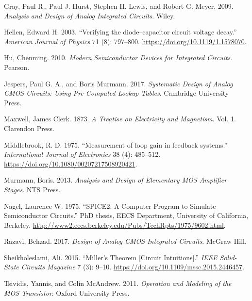 \documentclass[
  a4paper,
  DIV=11,
  numbers=noendperiod]{scrartcl}
\newlength{\cslhangindent}
\newenvironment{CSLReferences}[2] %
 {\begin{list}{}{%
  \setlength{\itemindent}{0pt}
  \setlength{\leftmargin}{0pt}
  \setlength{\parsep}{0pt}
  \ifodd #1
   \setlength{\leftmargin}{\cslhangindent}
   \setlength{\itemindent}{-1\cslhangindent}
  \fi
  \setlength{\itemsep}{#2\baselineskip}}}
 {\end{list}}
\begin{document}
\label{refs}
\begin{CSLReferences}{1}{0}
Gray, Paul R., Paul J. Hurst, Stephen H. Lewis, and Robert G. Meyer.
2009. \emph{{Analysis and Design of Analog Integrated Circuits}}. Wiley.

Hellen, Edward H. 2003. {``{Verifying the diode--capacitor circuit
voltage decay}.''} \emph{American Journal of Physics} 71 (8): 797--800.
\url{https://doi.org/10.1119/1.1578070}.

Hu, Chenming. 2010. \emph{Modern Semiconductor Devices for Integrated
Circuits}. Pearson.

Jespers, Paul G. A., and Boris Murmann. 2017. \emph{Systematic Design of
Analog CMOS Circuits: Using Pre-Computed Lookup Tables}. Cambridge
University Press.

Maxwell, James Clerk. 1873. \emph{A Treatise on Electricity and
Magnetism}. Vol. 1. Clarendon Press.

Middlebrook, R. D. 1975. {``{Measurement of loop gain in feedback
systems}.''} \emph{International Journal of Electronics} 38 (4):
485--512. \url{https://doi.org/10.1080/00207217508920421}.

Murmann, Boris. 2013. \emph{{Analysis and Design of Elementary MOS
Amplifier Stages}}. NTS Press.

Nagel, Laurence W. 1975. {``SPICE2: A Computer Program to Simulate
Semiconductor Circuits.''} PhD thesis, EECS Department, University of
California, Berkeley.
\url{http://www2.eecs.berkeley.edu/Pubs/TechRpts/1975/9602.html}.

Razavi, Behzad. 2017. \emph{{Design of Analog CMOS Integrated
Circuits}}. McGraw-Hill.

Sheikholeslami, Ali. 2015. {``{Miller's Theorem {[}Circuit
Intuitions{]}}.''} \emph{IEEE Solid-State Circuits Magazine} 7 (3):
9--10. \url{https://doi.org/10.1109/mssc.2015.2446457}.

Tsividis, Yannis, and Colin McAndrew. 2011. \emph{Operation and Modeling
of the MOS Transistor}. Oxford University Press.

\end{CSLReferences}
\end{document}
